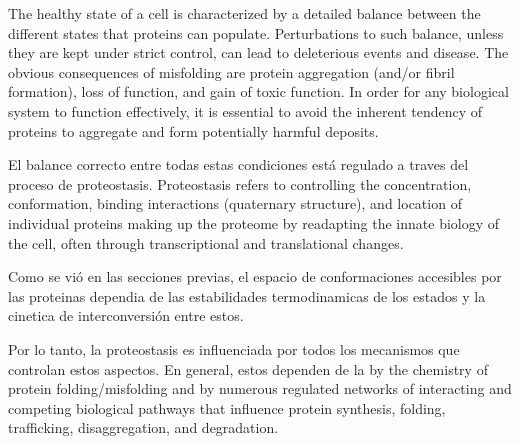 The healthy state of a cell is characterized by a detailed balance between the different states that proteins can populate. 
Perturbations to such balance, unless they are kept under strict control, can lead to deleterious events and disease.
The  obvious  consequences  of  misfolding  are protein  aggregation  (and/or  fibril  formation),  loss  of  function,  and  gain  of  toxic  function.  
In  order  for  any  biological  system  to  function  effectively,  it  is essential to avoid the inherent tendency of proteins to aggregate and form potentially harmful deposits.


El balance correcto entre todas estas condiciones está regulado a traves del proceso de proteostasis.
Proteostasis refers to controlling the concentration, conformation, binding interactions (quaternary structure), and location of individual proteins making up the proteome by readapting the innate biology of the cell, 
often through transcriptional and translational changes.

Como se vió en las secciones previas, el espacio de conformaciones accesibles por las proteinas dependia de las estabilidades termodinamicas de los estados y la cinetica de interconversión entre estos. 

Por lo tanto, la proteostasis es influenciada por todos los mecanismos que controlan estos aspectos.
En general, estos dependen de la 
by the chemistry of protein folding/misfolding and by numerous regulated networks of interacting and competing biological pathways 
that influence protein synthesis, folding, trafficking, disaggregation, and degradation.

